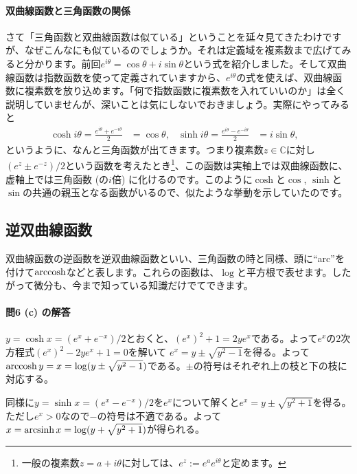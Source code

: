 \paragraph{双曲線函数と三角函数の関係}

さて「三角函数と双曲線函数は似ている」ということを延々見てきたわけですが、なぜこんなにも似ているのでしょうか。それは定義域を複素数まで広げてみると分かります。前回$e^{i\theta} = \cos\theta + i \sin \theta$という式を紹介しました。そして双曲線函数は指数函数を使って定義されていますから、$e^{i\theta}$の式を使えば、双曲線函数に複素数を放り込めます。「何で指数函数に複素数を入れていいのか」は全く説明していませんが、深いことは気にしないでおきましょう。実際にやってみると
\begin{align*}
\cosh i\theta = \frac{e^{i\theta} + e^{-i\theta}}{2} &= \cos \theta, &
\sinh i\theta = \frac{e^{i\theta} - e^{-i\theta}}{2} &= i\sin \theta, &
\end{align*}
というように、なんと三角函数が出てきます。つまり複素数$z\in\mathbb{C}$に対し$(e^z \pm e^{-z})/2$という函数を考えたとき\footnote{一般の複素数$z=a+i\theta$に対しては、$e^z := e^a e^{i\theta}$と定めます。}、この函数は実軸上では双曲線函数に、虚軸上では三角函数 (の$i$倍) に化けるのです。このように$\cosh$と$\cos$, $\sinh$と$\sin$の共通の親玉となる函数がいるので、似たような挙動を示していたのです。

\subsection{逆双曲線函数}

双曲線函数の逆函数を逆双曲線函数といい、三角函数の時と同様、頭に``arc''を付けて$\operatorname{arccosh}$などと表します。これらの函数は、$\log$と平方根で表せます。したがって微分も、今まで知っている知識だけでてできます。

\paragraph{問6 (c) の解答}

$y=\cosh x = (e^x+e^{-x})/2$とおくと、$(e^x)^2 + 1 = 2ye^x$である。よって$e^x$の$2$次方程式$(e^x)^2 - 2y e^x+1=0$を解いて
$e^x = y\pm\sqrt{y^2-1}$を得る。よって$\operatorname{arccosh} y = x = \log(y\pm\sqrt{y^2-1})$である。$\pm$の符号はそれぞれ上の枝と下の枝に対応する。

同様に$y=\sinh x = (e^x - e^{-x})/2$を$e^x$について解くと$e^x=y\pm\sqrt{y^2+1}$を得る。ただし$e^x>0$なので$-$の符号は不適である。よって$x=\operatorname{arcsinh} x=\log(y+\sqrt{y^2+1})$が得られる。

